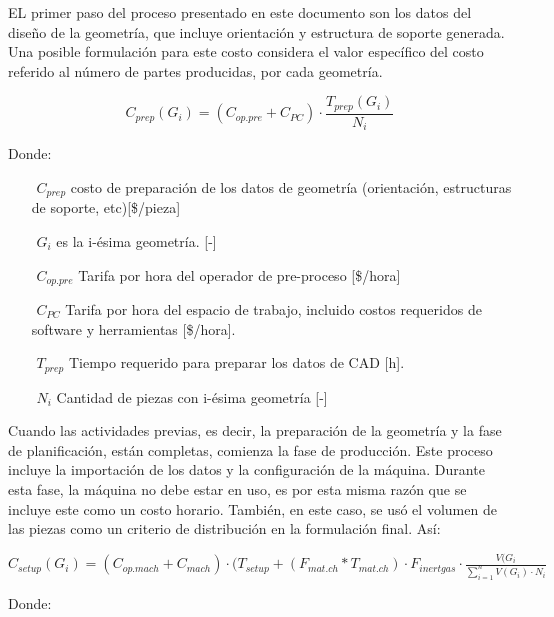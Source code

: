 \begin{description}
EL primer paso del proceso presentado en este documento son los datos del diseño de la geometría, que incluye orientación y estructura de soporte generada. Una posible formulación para este costo considera el valor específico del costo referido al número de partes producidas, por cada geometría.  

$$C_{prep}(G_i)=(C_{op.pre}+C_{PC})\cdot \frac{T_{prep}(G_i)}{N_i}$$

Donde:

\begin{itemize}
\item[$ $] $C_{prep} $ costo de preparación de los datos de geometría (orientación, estructuras de soporte, etc)[\$/pieza] 
\item[$ $] $G_i $ es la i-ésima geometría. [-]
\item[$ $] $C_{op.pre} $ Tarifa por hora del operador de pre-proceso  [\$/hora]
\item[$ $] $C_{PC} $ Tarifa por hora del espacio de trabajo, incluido costos requeridos de software y herramientas [\$/hora].
\item[$ $] $T_{prep} $ Tiempo requerido para preparar los datos de CAD [h].
\item[$ $] $N_i$ Cantidad de piezas con i-ésima geometría [-]
\end{itemize}

Cuando las actividades previas, es decir, la preparación de la geometría y la fase de planificación, están completas, comienza la fase de producción. Este proceso incluye la importación de los datos y la configuración de la máquina. Durante esta fase, la máquina no debe estar en uso, es por esta misma razón que se incluye este como un costo horario. También, en este caso, se usó el volumen de las piezas como un criterio de distribución en la formulación final. Así:


$C_{setup}(G_i)=(C_{op.mach}+C_{mach})\cdot(T_{setup}+(F_{mat.ch}*T_{mat.ch})\cdot F_{inertgas}\cdot \frac{V(G_i}{\sum_{i=1}^{n} V(G_i)\cdot N_i}$

Donde:


\end{description}
